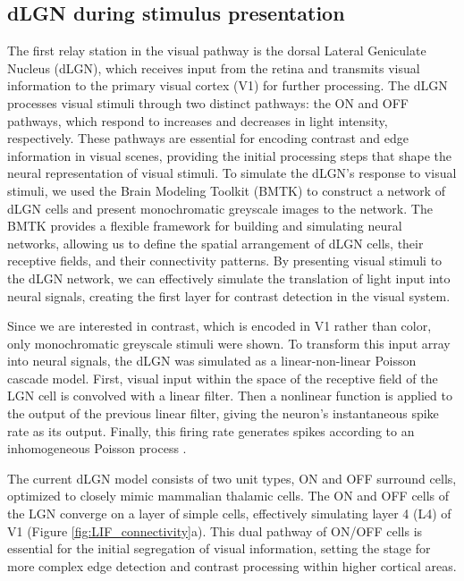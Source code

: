 \documentclass[12pt]{article}
\begin{document}
\subsection{dLGN during stimulus presentation}
The first relay station in the visual pathway is the dorsal Lateral Geniculate Nucleus (dLGN), which receives input from the retina and transmits visual information to the primary visual cortex (V1) for further processing. The dLGN processes visual stimuli through two distinct pathways: the ON and OFF pathways, which respond to increases and decreases in light intensity, respectively. These pathways are essential for encoding contrast and edge information in visual scenes, providing the initial processing steps that shape the neural representation of visual stimuli. To simulate the dLGN's response to visual stimuli, we used the Brain Modeling Toolkit (BMTK) to construct a network of dLGN cells and present monochromatic greyscale images to the network. The BMTK provides a flexible framework for building and simulating neural networks, allowing us to define the spatial arrangement of dLGN cells, their receptive fields, and their connectivity patterns. By presenting visual stimuli to the dLGN network, we can effectively simulate the translation of light input into neural signals, creating the first layer for contrast detection in the visual system.

Since we are interested in contrast, which is encoded in V1 rather than color, only monochromatic greyscale stimuli were shown. To transform this input array into neural signals, the dLGN was simulated as a linear-non-linear Poisson cascade model. First, visual input within the space of the receptive field of the LGN cell is convolved with a linear filter. Then a nonlinear function is applied to the output of the previous linear filter, giving the neuron's instantaneous spike rate as its output. Finally, this firing rate generates spikes according to an inhomogeneous Poisson process \autocite{moskovitzComparisonDeepLearning2018}.

The current dLGN model consists of two unit types, ON and OFF surround cells, optimized to closely mimic mammalian thalamic cells. The ON and OFF cells of the LGN converge on a layer of simple cells, effectively simulating layer 4 (L4) of V1 (Figure \ref{fig:LIF_connectivity}a). This dual pathway of ON/OFF cells is essential for the initial segregation of visual information, setting the stage for more complex edge detection and contrast processing within higher cortical areas.
\end{document}
